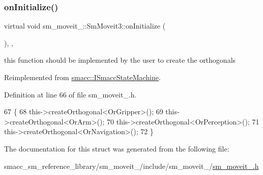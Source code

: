 \subsubsection{\texorpdfstring{on\+Initialize()}{onInitialize()}}
{\footnotesize\ttfamily virtual void sm\+\_\+moveit\+\_\+::\+Sm\+Moveit3\+::on\+Initialize (\begin{DoxyParamCaption}{ }\end{DoxyParamCaption})\hspace{0.3cm}{\ttfamily [inline]}, {\ttfamily [override]}, {\ttfamily [virtual]}}



this function should be implemented by the user to create the orthogonals 



Reimplemented from \hyperlink{classsmacc_1_1ISmaccStateMachine_ac2982c6c8283663e5e1e8a7c82f511ec}{smacc\+::\+I\+Smacc\+State\+Machine}.



Definition at line 66 of file sm\+\_\+moveit\+\_.\+h.


\begin{DoxyCode}
67     \{
68         this->createOrthogonal<OrGripper>();
69         this->createOrthogonal<OrArm>();
70         this->createOrthogonal<OrPerception>();
71         this->createOrthogonal<OrNavigation>();
72     \}
\end{DoxyCode}


The documentation for this struct was generated from the following file\+:\begin{DoxyCompactItemize}
\item 
smacc\+\_\+sm\+\_\+reference\+\_\+library/sm\+\_\+moveit\+\_/include/sm\+\_\+moveit\+\_/\hyperlink{sm__moveit__3_8h}{sm\+\_\+moveit\+\_.\+h}\end{DoxyCompactItemize}
